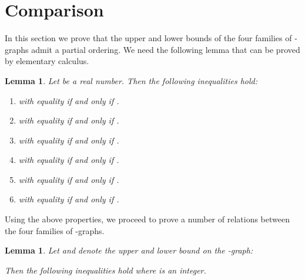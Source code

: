 \documentclass[12pt]{article}
\newtheorem{lem}[defin]{Lemma}
\newenvironment{lemma}{\begin{lem} \sl}{\end{lem}}
\begin{document}
\section{Comparison}
\label{sec:Comparison}
In this section we prove that the upper and lower bounds of the four families of -graphs admit a partial ordering. We need the following lemma that can be proved by elementary calculus. 

\begin{lemma}
\label{lemma trigonometric inequalities}
  Let  be a real number. Then the following inequalities hold:
  \begin{enumerate}
    \item \label{lemma trigonometric inequalities item sin <}
     with equality if and only if .

    \item \label{lemma trigonometric inequalities item cos >}
     with equality if and only if .

    \item \label{lemma trigonometric inequalities item sin >}
     with equality if and only if .

    \item \label{lemma trigonometric inequalities item cos <}
     with equality if and only if .

    \item \label{lemma trigonometric inequalities item tan >}
     with equality if and only if .

    \item \label{lemma trigonometric inequalities item tan^2 >}
     with equality if and only if .
  \end{enumerate}
\end{lemma}


Using the above properties, we proceed to prove a number of relations between the four families of -graphs. 

\setcounter{equation}{0}
\renewcommand{\theequation}{\alph{equation}}

\begin{lemma}
  \label{proposition inequalities}
  Let  and  denote the upper and lower bound on the -graph: 
  
  Then the following inequalities hold where  is an integer.
  
\end{lemma}

\setcounter{equation}{2}
\renewcommand{\theequation}{\arabic{equation}}
\end{document}
